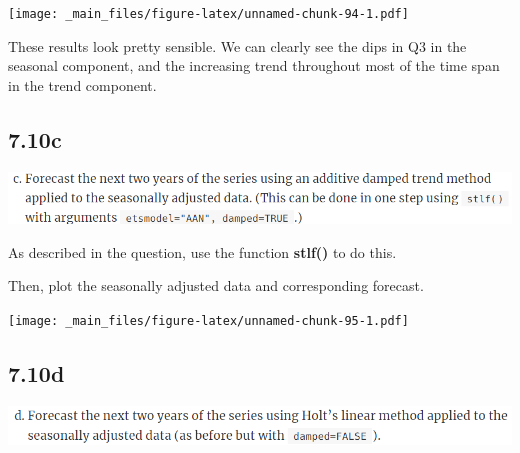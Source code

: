 \documentclass[]{book}
\newenvironment{Shaded}{\begin{snugshade}}{\end{snugshade}}
\newcommand{\DataTypeTok}[1]{\textcolor[rgb]{0.13,0.29,0.53}{#1}}
\newcommand{\DecValTok}[1]{\textcolor[rgb]{0.00,0.00,0.81}{#1}}
\newcommand{\KeywordTok}[1]{\textcolor[rgb]{0.13,0.29,0.53}{\textbf{#1}}}
\newcommand{\NormalTok}[1]{#1}
\newcommand{\OperatorTok}[1]{\textcolor[rgb]{0.81,0.36,0.00}{\textbf{#1}}}
\newcommand{\OtherTok}[1]{\textcolor[rgb]{0.56,0.35,0.01}{#1}}
\newcommand{\StringTok}[1]{\textcolor[rgb]{0.31,0.60,0.02}{#1}}
\begin{document}
\texttt{[image: \_main\_files/figure-latex/unnamed-chunk-94-1.pdf]}

These results look pretty sensible. We can clearly see the dips in Q3 in the seasonal component, and the increasing trend throughout most of the time span in the trend component.

\hypertarget{c-6}{%
\subsection{7.10c}\label{c-6}}

\includegraphics{./week4/7.10c.png}

As described in the question, use the function \textbf{stlf()} to do this.

Then, plot the seasonally adjusted data and corresponding forecast.

\begin{Shaded}
\end{Shaded}

\texttt{[image: \_main\_files/figure-latex/unnamed-chunk-95-1.pdf]}

\hypertarget{d-3}{%
\subsection{7.10d}\label{d-3}}

\includegraphics{./week4/7.10d.png}
\end{document}
